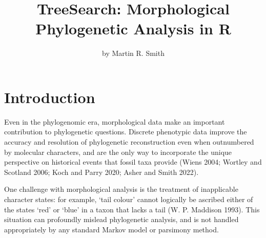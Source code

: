 \title{TreeSearch: Morphological Phylogenetic Analysis in R}
\author{by Martin R. Smith}

\maketitle


\hypertarget{introduction}{%
\section{Introduction}\label{introduction}}

Even in the phylogenomic era, morphological data make an important contribution
to phylogenetic questions. Discrete phenotypic data improve the accuracy and
resolution of phylogenetic reconstruction even when outnumbered by molecular
characters, and are the only way to incorporate the unique perspective on
historical events that fossil taxa provide (Wiens 2004; Wortley and Scotland 2006; Koch and Parry 2020; Asher and Smith 2022).

One challenge with morphological analysis is the treatment of inapplicable
character states: for example, `tail colour' cannot logically be ascribed either
of the states `red' or `blue' in a taxon that lacks a tail (W. P. Maddison 1993). This
situation can profoundly mislead phylogenetic analysis, and is not handled
appropriately by any standard Markov model or parsimony method.

